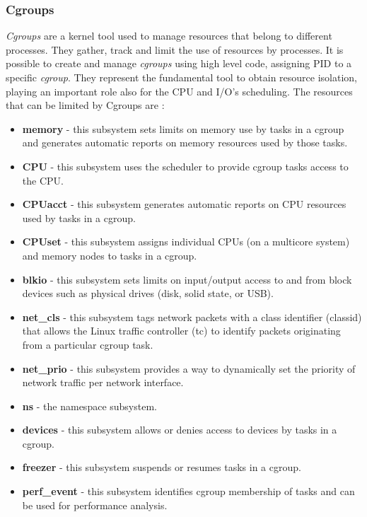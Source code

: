 \documentclass[a4paper,12pt]{article}
\begin{document}
\subsubsection{Cgroups}

\textit{Cgroups} are a kernel tool used to manage resources that belong to
different processes. They gather, track and limit the use of resources by
processes. It is possible to create and manage \textit{cgroups} using high level
code, assigning PID to a specific \textit{cgroup}. They represent the
fundamental tool to obtain resource isolation, playing an important role also
for the CPU and I/O's scheduling. The resources that can be limited by Cgroups
are \cite{red_hat_introduction_to_cgroups}:
\begin{itemize}
  \item \textbf{memory} - this subsystem sets limits on memory use by tasks in a
  cgroup and generates automatic reports on memory resources used by those
  tasks. 
  \item \textbf{CPU} - this subsystem uses the scheduler to provide cgroup tasks
  access to the CPU. 
  \item \textbf{CPUacct} - this subsystem generates automatic reports on CPU
  resources used by tasks in a cgroup. 
  \item \textbf{CPUset} - this subsystem assigns individual CPUs (on a multicore
  system) and memory nodes to tasks in a cgroup.
  \item \textbf{blkio} - this subsystem sets limits on input/output access to
  and from block devices such as physical drives (disk, solid state, or USB). 
  \item \textbf{net\_cls} - this subsystem tags network packets with a class
  identifier (classid) that allows the Linux traffic controller (tc) to identify
  packets originating from a particular cgroup task. 
  \item \textbf{net\_prio} - this subsystem provides a way to dynamically set
  the priority of network traffic per network interface. 
  \item \textbf{ns} - the namespace subsystem. 
  \item \textbf{devices} - this subsystem allows or denies access to devices by
  tasks in a cgroup. 
  \item \textbf{freezer} - this subsystem suspends or resumes tasks in a cgroup.
  \item \textbf{perf\_event} - this subsystem identifies cgroup membership of
  tasks and can be used for performance analysis. 
\end{itemize}   
\end{document}
